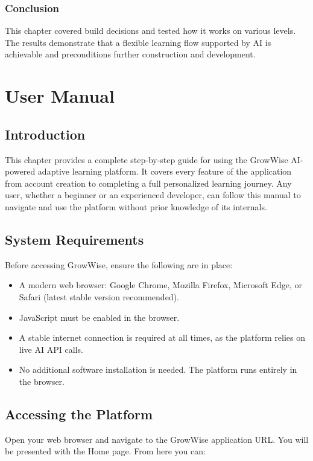 \documentclass{FastFyp}
\begin{document}
\subsection{Conclusion}
This chapter covered build decisions and tested how it works on various levels. The results demonstrate that a flexible learning flow supported by AI is achievable and preconditions further construction and development.


\chapter{User Manual}

\section{Introduction}

This chapter provides a complete step-by-step guide for using the GrowWise AI-powered adaptive learning platform. It covers every feature of the application from account creation to completing a full personalized learning journey. Any user, whether a beginner or an experienced developer, can follow this manual to navigate and use the platform without prior knowledge of its internals.

\section{System Requirements}

Before accessing GrowWise, ensure the following are in place:

\begin{itemize}
    \item A modern web browser: Google Chrome, Mozilla Firefox, Microsoft Edge, or Safari (latest stable version recommended).
    \item JavaScript must be enabled in the browser.
    \item A stable internet connection is required at all times, as the platform relies on live AI API calls.
    \item No additional software installation is needed. The platform runs entirely in the browser.
\end{itemize}

\section{Accessing the Platform}

Open your web browser and navigate to the GrowWise application URL. You will be presented with the Home page. From here you can:
\end{document}
